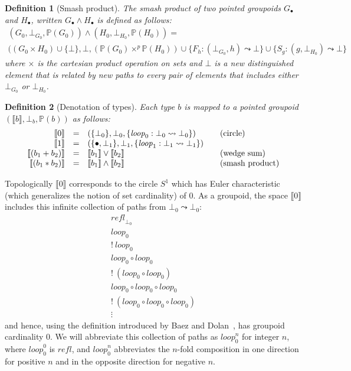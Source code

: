\documentclass[11pt]{article}
\newtheorem{definition}{Definition}
\newcommand{\union}{\cup}
\newcommand{\refl}{\mathit{refl}}
\renewcommand{\path}{\leadsto}
\newcommand{\paths}[1]{\mathds{P}(#1)}
\newcommand{\dt}[1]{\llbracket #1 \rrbracket}
\newcommand{\wedgesum}{\vee}
\newcommand{\smashproduct}{\wedge}
\begin{document}
\begin{definition}[Smash product]
The \emph{smash product} of two pointed groupoids $G_\bullet$ and
$H_\bullet$, written $G_\bullet \smashproduct H_\bullet$ is defined as
follows:
\[\begin{array}{l}
(G_0, \bot_{G_0}, \paths{G_0}) \smashproduct
(H_0, \bot_{H_0}, \paths{H_0}) = \\
((G_0 \times H_0) \union \{ \bot \},
 \bot,
 (\paths{G_0} \times^p \paths{H_0}) \union
 \{ F_h: (\bot_{G_0},h) \path \bot \} \union 
 \{ S_g: (g,\bot_{H_0}) \path \bot \} 
\end{array}\]
where $\times$ is the cartesian product operation on sets and $\bot$ is a new
distinguished element that is related by new paths to every pair of elements
that includes either $\bot_{G_0}$ or $\bot_{H_0}$. 
\end{definition}

\begin{definition}[Denotation of types]
Each type $b$ is mapped to a \emph{pointed groupoid} $(\dt{b}, \bot_b,
\paths{b})$ as follows:
\[\begin{array}{rcl@{\qquad}l}
\dt{0} &=& (\{ \bot_0 \}, \bot_0, \{ \mathit{loop}_0 : \bot_0 \path \bot_0 \}) &
           (\mbox{circle}) \\
\dt{1} &=& (\{ \bullet, \bot_1 \}, \bot_1, 
           \{ \mathit{loop}_1 : \bot_1 \path \bot_1 \}) &\\
\dt{(b_1 + b_2)} &=& \dt{b_1} \wedgesum \dt{b_2} & 
           (\mbox{wedge~sum}) \\
\dt{(b_1 * b_2)} &=& \dt{b_1} \smashproduct \dt{b_2} & 
           (\mbox{smash~product})
\end{array}\]
\end{definition} 

Topologically $\dt{0}$ corresponds to the circle $S^1$ which has Euler
characteristic (which generalizes the notion of set cardinality) of 0. As a
groupoid, the space $\dt{0}$ includes this infinite collection of paths from
$\bot_0 \path \bot_0$:
\[\begin{array}{l}
\refl_{\bot_0} \\
\mathit{loop}_0 \\
!~\mathit{loop}_0 \\
\mathit{loop}_0 \circ \mathit{loop}_0 \\
!~(\mathit{loop}_0 \circ \mathit{loop}_0) \\
\mathit{loop}_0 \circ \mathit{loop}_0 \circ \mathit{loop}_0 \\
!~(\mathit{loop}_0 \circ \mathit{loop}_0 \circ \mathit{loop}_0) \\
\vdots
\end{array}\]
and hence, using the definition introduced by Baez and
Dolan~\cite{groupoidcard}, has groupoid cardinality 0. We will abbreviate
this collection of paths as $\mathit{loop}^n_0$ for integer $n$, where
$\mathit{loop}^0_0$ is $\refl$, and $\mathit{loop}^n_0$ abbreviates the
$n$-fold composition in one direction for positive $n$ and in the opposite
direction for negative $n$.
\end{document}
